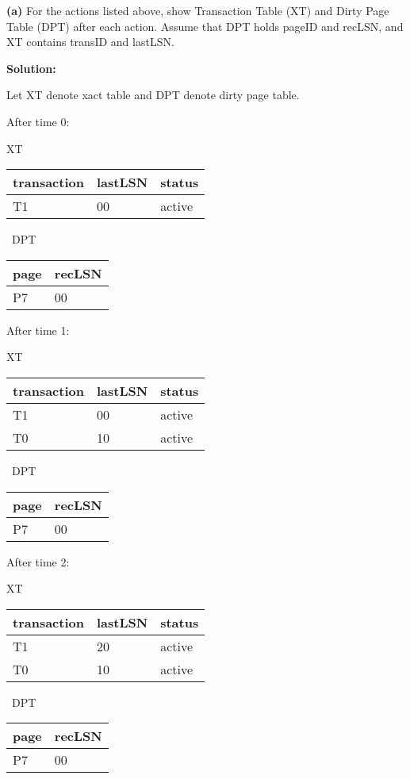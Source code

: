 \documentclass[11pt]{article}
\renewcommand\part[1]{\vspace{.10in}\textbf{(#1)}}
\begin{document}
 \part{a} For the actions listed above, show Transaction Table (XT)
  and Dirty Page Table (DPT) after each action. Assume that 
  DPT holds pageID and recLSN, and XT contains transID and
  lastLSN.
   
{\bf Solution:}

Let XT denote xact table and DPT denote dirty page table.

After time 0:

XT   \begin{tabular}{ |l |l |l |}\hline
  transaction & lastLSN & status \\\hline
  T1 & 00 & active  \\\hline
  \end{tabular} 
 \ DPT \begin{tabular}{ |l |l |}\hline
    page & recLSN \\\hline
    P7 & 00  \\\hline
    \end{tabular} 
  
After time 1:

XT   \begin{tabular}{ |l |l |l |}\hline
  transaction & lastLSN & status \\\hline
  T1 & 00 & active  \\\hline
  T0 & 10 & active  \\\hline
  \end{tabular} 
 \ DPT \begin{tabular}{ |l |l |}\hline
    page & recLSN \\\hline
    P7 & 00  \\\hline
    \end{tabular} 

After time 2:

XT   \begin{tabular}{ |l |l |l |}\hline
  transaction & lastLSN & status \\\hline
  T1 & 20 & active  \\\hline
  T0 & 10 & active  \\\hline
  \end{tabular} 
 \ DPT \begin{tabular}{ |l |l |}\hline
    page & recLSN \\\hline
    P7 & 00  \\\hline
    \end{tabular}
    
\end{document}
